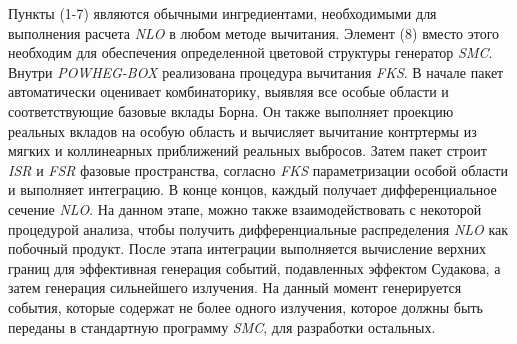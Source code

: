 Пункты (1-7) являются обычными ингредиентами, необходимыми для выполнения расчета \textit{NLO}
в любом методе вычитания. Элемент (8) вместо этого необходим для обеспечения определенной цветовой структуры
генератор \textit{SMC}. Внутри \textit{POWHEG-BOX} реализована процедура вычитания \textit{FKS}. В начале пакет автоматически оценивает комбинаторику, выявляя
все особые области и соответствующие базовые вклады Борна. Он также выполняет
проекцию реальных вкладов на особую область и вычисляет вычитание
контртермы из мягких и коллинеарных приближений реальных выбросов. Затем пакет строит
\textit{ISR} и \textit{FSR} фазовые пространства, согласно \textit{FKS} параметризации особой области и
выполняет интеграцию. В конце концов, каждый получает дифференциальное сечение \textit{NLO}. На данном этапе,
можно также взаимодействовать с некоторой процедурой анализа, чтобы получить дифференциальные распределения \textit{NLO} как
побочный продукт. После этапа интеграции выполняется вычисление верхних границ для
эффективная генерация событий, подавленных эффектом Судакова, а затем генерация сильнейшего излучения. На данный момент генерируется события, которые содержат не более одного излучения, которое должны быть переданы в стандартную программу \textit{SMC}, для разработки остальных.

